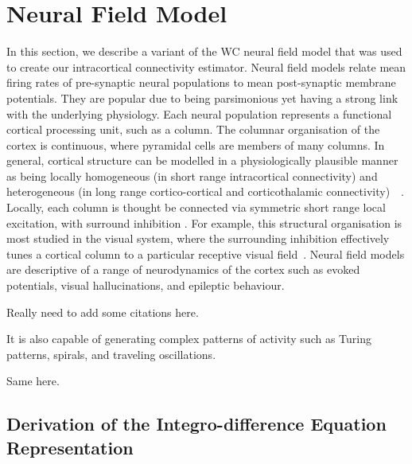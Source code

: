 \documentclass[twocolumn,11pt,a4paper]{article}		%
\begin{document}
\section{Neural Field Model}\label{NeuralModelSection} In this section, we describe a variant of the WC neural field model \cite{Wilson1973} that was used to create our intracortical connectivity estimator. Neural field models relate mean firing rates of pre-synaptic neural populations to mean post-synaptic membrane potentials. They are popular due to being parsimonious yet having a strong link with the underlying physiology. Each neural population represents a functional cortical processing unit, such as a column. The columnar organisation of the cortex is continuous, where pyramidal cells are members of many columns. In general, cortical structure can be modelled in a physiologically plausible manner as being locally homogeneous (in short range intracortical connectivity) and heterogeneous (in long range cortico-cortical and corticothalamic connectivity)~\cite{Jirsa2009}~\cite{Qubbaj2007}. Locally, each column is thought be connected via symmetric short range local excitation, with surround inhibition \cite{Braitenberg1998}. For example, this structural organisation is most studied in the visual system, where the surrounding inhibition effectively tunes a cortical column to a particular receptive visual field~\cite{Sullivan2006}. Neural field models are descriptive of a range of neurodynamics of the cortex such as evoked potentials, visual hallucinations, and epileptic behaviour. 
\begin{todo}
	{Really need to add some citations here.} 
\end{todo}
It is also capable of generating complex patterns of activity such as Turing patterns, spirals, and traveling oscillations. 
\begin{todo}
	{Same here.} 
\end{todo}

\subsection{Derivation of the Integro-difference Equation Representation}
\end{document}

